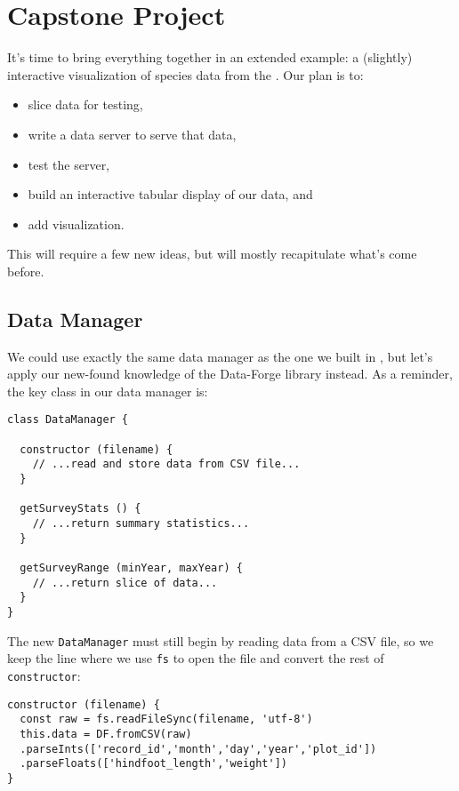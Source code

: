 \chapter{Capstone Project}\label{s:capstone}

It's time to bring everything together in an extended example:
a (slightly) interactive visualization of species data from
the .
Our plan is to:

\begin{itemize}
\item
  slice data for testing,
\item
  write a data server to serve that data,
\item
  test the server,
\item
  build an interactive tabular display of our data, and
\item
  add visualization.
\end{itemize}

\noindent
This will require a few new ideas,
but will mostly recapitulate what's come before.

\section{Data Manager}\label{s:capstone-data}

We could use exactly the same data manager as the one we built in ,
but let's apply our new-found knowledge of the Data-Forge library instead.
As a reminder,
the key class in our data manager is:

\begin{verbatim}
class DataManager {

  constructor (filename) {
    // ...read and store data from CSV file...
  }

  getSurveyStats () {
    // ...return summary statistics...
  }

  getSurveyRange (minYear, maxYear) {
    // ...return slice of data...
  }
}
\end{verbatim}

The new \texttt{DataManager} must still begin by reading data from a CSV file,
so we keep the line where we use \texttt{fs} to open the file
and convert the rest of \texttt{constructor}:

\begin{verbatim}
constructor (filename) {
  const raw = fs.readFileSync(filename, 'utf-8')
  this.data = DF.fromCSV(raw)
  .parseInts(['record_id','month','day','year','plot_id'])
  .parseFloats(['hindfoot_length','weight'])
}
\end{verbatim}

